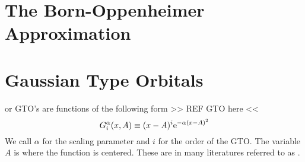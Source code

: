 \section{The Born-Oppenheimer Approximation\label{sec:BornOppenheimer}}

\section{Gaussian Type Orbitals}
     or GTO's are functions of the following form
    >> REF GTO here <<
        \begin{equation}
            G^{\alpha}_{i}(x,A) \equiv (x-A)^i\mathrm{e}^{-\alpha (x-A)^2}
            \label{eq:GTOdef1d}
        \end{equation}
    We call $\alpha$ for the scaling parameter and $i$ for the order of the
    GTO. The variable $A$ is where the function is centered. These are in many
    literatures referred to as .
